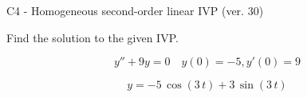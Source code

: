 \begin{exercise}
  \begin{exerciseTitle}C4 - Homogeneous second-order linear IVP (ver. 30)\end{exerciseTitle}
  \begin{exerciseStatement}
    
Find the solution to the given IVP.

    
\[y''+9y = 0 \hspace{1em} y(0) = -5 , y'(0) = 9\]

  \end{exerciseStatement}
  \begin{exerciseAnswer}
    
\[y= -5 \, \cos\left(3 \, t\right) + 3 \, \sin\left(3 \, t\right)\]

  \end{exerciseAnswer}
\end{exercise}